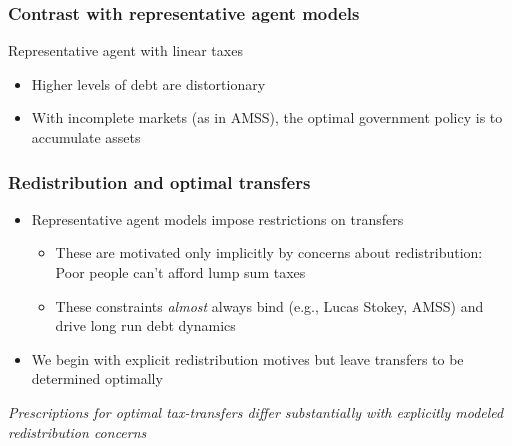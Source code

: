 \documentclass{beamer}
\begin{document}
\begin{frame}
\frametitle{Contrast with representative agent models}
 Representative agent with linear taxes
\begin{itemize}
 \item Higher levels of debt are distortionary
 \item With incomplete markets (as in  AMSS), the optimal  government policy is to accumulate assets
 \end{itemize}

 \end{frame}

 \begin{frame}
 \frametitle{Redistribution and optimal transfers}
 \begin{itemize}
  \item Representative agent models impose restrictions on transfers
  \begin{itemize}
 \item These are motivated only implicitly by concerns about  redistribution:  Poor people can't afford lump sum taxes
  \item These constraints \emph{almost} always bind (e.g.,  Lucas Stokey, AMSS) and drive long run debt dynamics
  \end{itemize}
\item We begin with explicit redistribution motives but leave transfers to be determined optimally
 \end{itemize}

 \vspace{4mm}
 \color{red}\emph{Prescriptions for optimal tax-transfers differ substantially with explicitly modeled redistribution concerns}
 \end{frame}
\end{document}
